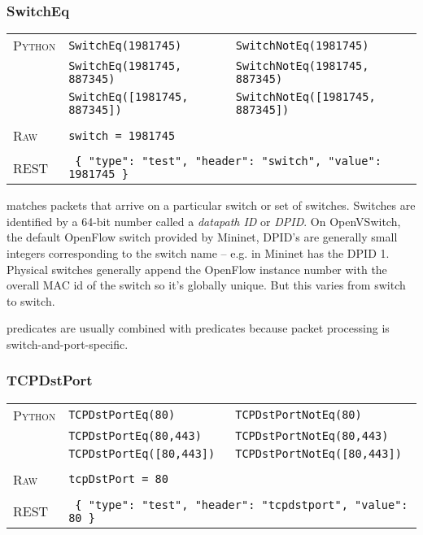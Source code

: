 \subsubsection{SwitchEq}

\bigskip
\begin{tabularx}{\linewidth}{lXX}
\textsc{Python} 	& \texttt{SwitchEq(1981745)} 		& \texttt{SwitchNotEq(1981745)} \\
	 	& \texttt{SwitchEq(1981745, 887345)} 	& \texttt{SwitchNotEq(1981745, 887345)} \\
	 	& \texttt{SwitchEq([1981745, 887345])} 	& \texttt{SwitchNotEq([1981745, 887345])} \\ \\
\textsc{Raw}		& \texttt{switch = 1981745} 		& \\ \\
\textsc{REST}	& \multicolumn{2}{l}{\texttt{ \{ "type": "test", "header": "switch", "value": 1981745 \} }} 
\end{tabularx}

 matches packets that arrive on a particular switch or set of switches.  
Switches are identified by 
a 64-bit number called a \emph{datapath ID} or \emph{DPID}.  On OpenVSwitch, the default OpenFlow
switch provided by Mininet, DPID's are generally small integers corresponding to the switch name --
e.g.  in Mininet has the DPID 1.  Physical switches generally append the OpenFlow instance
number with the overall MAC id of the switch so it's globally unique.  But this varies from switch
to switch. 

 predicates are usually combined with  predicates because packet processing
is switch-and-port-specific.  

\subsubsection{TCPDstPort}

\bigskip
\begin{tabularx}{\linewidth}{lXX}
\textsc{Python}   & \texttt{TCPDstPortEq(80)}    & \texttt{TCPDstPortNotEq(80)} \\
    & \texttt{TCPDstPortEq(80,443)}  & \texttt{TCPDstPortNotEq(80,443)} \\
    & \texttt{TCPDstPortEq([80,443])}  & \texttt{TCPDstPortNotEq([80,443])} \\ \\
\textsc{Raw}    & \texttt{tcpDstPort = 80}     & \\ \\
\textsc{REST} & \multicolumn{2}{l}{\texttt{ \{ "type": "test", "header": "tcpdstport", "value": 80 \} }} 
\end{tabularx}

